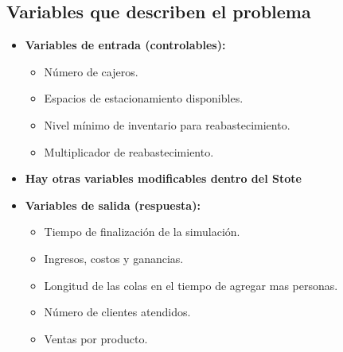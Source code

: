 \documentclass[12pt, a4paper]{article}
\begin{document}
\subsection{Variables que describen el problema}
\begin{itemize}
    \item \textbf{Variables de entrada (controlables):}
    \begin{itemize}
        \item Número de cajeros.
        \item Espacios de estacionamiento disponibles.
        \item Nivel mínimo de inventario para reabastecimiento.
        \item Multiplicador de reabastecimiento.
    \end{itemize}
    
    \item \textbf{Hay otras variables modificables dentro del Stote}
    
    \item \textbf{Variables de salida (respuesta):}
    \begin{itemize}
        \item Tiempo de finalización de la simulación.
        \item Ingresos, costos y ganancias.
        \item Longitud de las colas en el tiempo de agregar mas personas.
        \item Número de clientes atendidos.
        \item Ventas por producto.
    \end{itemize}
\end{itemize}
\end{document}

